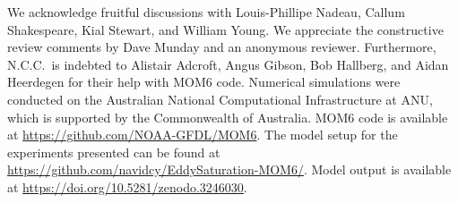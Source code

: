 \documentclass{agujournal2019}
\newcommand{\navidcomment}[1]{{\color{red} [#1]}}
\begin{document}







\acknowledgments
We acknowledge fruitful discussions with Louis-Phillipe Nadeau, Callum Shakespeare, Kial Stewart, and William Young. {\color{black}We appreciate the constructive review comments by Dave Munday and an anonymous reviewer.} Furthermore, N.C.C.~is indebted to Alistair Adcroft, Angus Gibson, Bob Hallberg, and Aidan Heerdegen for their help with MOM6 code. Numerical simulations were conducted on the Australian National Computational Infrastructure at ANU, which is supported by the Commonwealth of Australia. MOM6 code is available at \url{https://github.com/NOAA-GFDL/MOM6}. The model setup for the experiments presented can be found at \url{https://github.com/navidcy/EddySaturation-MOM6/}. Model output is available at \url{https://doi.org/10.5281/zenodo.3246030}.



\end{document}
